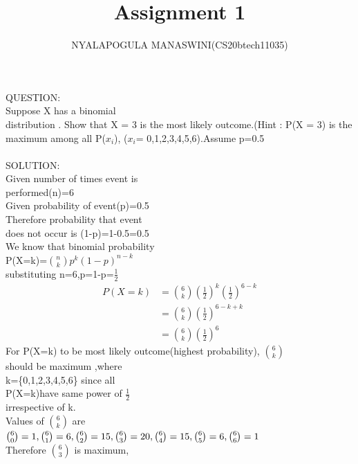 \documentclass{assignment}
\begin{document}
\title{Assignment 1}
\author{NYALAPOGULA MANASWINI(CS20btech11035)}
\maketitle
\begin{paracol}{2}
\switchcolumn[0]
\begin{Large}
QUESTION:\\
Suppose X has a binomial\\
 distribution . Show that X = 3 is the most likely outcome.(Hint : P(X = 3) is the maximum among all P($x_i$), ($x_i$= 0,1,2,3,4,5,6).Assume p=0.5\\
\\
SOLUTION:\\
Given number of times event is\\
 performed(n)=6\\
Given probability of event(p)=0.5\\
Therefore probability that event\\ does not occur is
 (1-p)=1-0.5=0.5\\
We know that binomial probability\\
P(X=k)=$ \binom{n}{k}p^k({1-p})^{n-k} $ \\
substituting n=6,p=1-p=$\frac{1}{2}$\\
\begin{align*}
P(X=k)&=\binom{6}{k}(\frac{1}{2})^k(\frac{1}{2})^{6-k}\\
&=\binom{6}{k}(\frac{1}{2})^{6-k+k}\\
&=\binom{6}{k}(\frac{1}{2})^{6}
\end{align*}
For P(X=k) to be most likely
\switchcolumn[1]
outcome(highest probability),
$\binom{6}{k}$\\
 should be maximum ,where\\
 k=\{0,1,2,3,4,5,6\} since all\\
 P(X=k)have same power of $\frac{1}{2}$\\
  irrespective of k. \\
Values of $\binom{6}{k}$ are\\
$\binom{6}{0}=1,\\
\binom{6}{1}=6,\\
\binom{6}{2}=15,\\
\binom{6}{3}=20,\\
\binom{6}{4}=15,\\
\binom{6}{5}=6,\\
\binom{6}{6}=1$\\
Therefore $\binom{6}{3}$ is maximum,\\

\end{Large}
\end{paracol}
\end{document}
